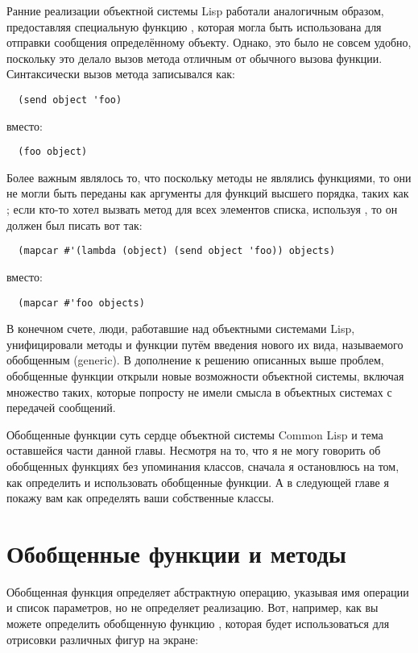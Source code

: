 Ранние реализации объектной системы Lisp работали аналогичным образом, предоставляя
специальную функцию , которая могла быть использована для отправки сообщения
определённому объекту.  Однако, это было не совсем удобно, поскольку это делало вызов
метода отличным от обычного вызова функции.  Синтаксически вызов метода записывался как:

\begin{lstlisting}
  (send object 'foo)
\end{lstlisting}

вместо:

\begin{lstlisting}
  (foo object)
\end{lstlisting}

Более важным являлось то, что поскольку методы не являлись функциями, то они не могли быть
переданы как аргументы для функций высшего порядка, таких как ; если кто-то
хотел вызвать метод для всех элементов списка, используя , то он должен был
писать вот так:

\begin{lstlisting}
  (mapcar #'(lambda (object) (send object 'foo)) objects)
\end{lstlisting}

вместо:

\begin{lstlisting}
  (mapcar #'foo objects)
\end{lstlisting}

В конечном счете, люди, работавшие над объектными системами Lisp, унифицировали методы и
функции путём введения нового их вида, называемого обобщенным (generic).  В дополнение к
решению описанных выше проблем, обобщенные функции открыли новые возможности объектной
системы, включая множество таких, которые попросту не имели смысла в объектных системах с
передачей сообщений.

Обобщенные функции суть сердце объектной системы Common Lisp и тема оставшейся части
данной главы.  Несмотря на то, что я не могу говорить об обобщенных функциях без
упоминания классов, сначала я остановлюсь на том, как определить и использовать обобщенные
функции.  А в следующей главе я покажу вам как определять ваши собственные классы.

\section{Обобщенные функции и методы}

Обобщенная функция определяет абстрактную операцию, указывая имя операции и список
параметров, но не определяет реализацию.  Вот, например, как вы можете определить
обобщенную функцию , которая будет использоваться для отрисовки различных фигур
на экране:

